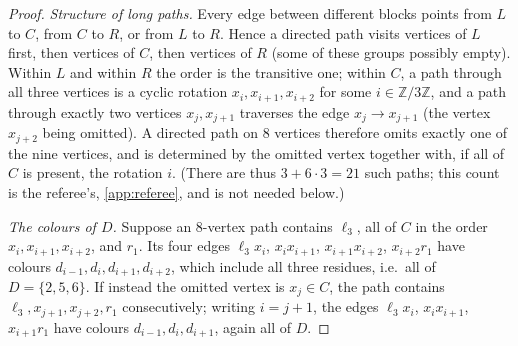 \documentclass[11pt,a4paper]{article}
\theoremstyle{plain}
\theoremstyle{definition}
\theoremstyle{remark}
\newcommand{\Z}{\mathbb Z}
\newcommand{\lv}{\ell}
\begin{document}
\label{pf:construction}
\lemconstr*
\begin{proof}
\emph{Structure of long paths.} Every edge between different blocks points from $L$ to $C$, from $C$ to $R$, or from $L$ to $R$. Hence a directed path visits vertices of $L$ first, then vertices of $C$, then vertices of $R$ (some of these groups possibly empty). Within $L$ and within $R$ the order is the transitive one; within $C$, a path through all three vertices is a cyclic rotation $x_i,x_{i+1},x_{i+2}$ for some $i\in\Z/3\Z$, and a path through exactly two vertices $x_j,x_{j+1}$ traverses the edge $x_j\to x_{j+1}$ (the vertex $x_{j+2}$ being omitted). A directed path on $8$ vertices therefore omits exactly one of the nine vertices, and is determined by the omitted vertex together with, if all of $C$ is present, the rotation $i$. (There are thus $3+6\cdot3=21$ such paths; this count is the referee's, \cref{app:referee}, and is not needed below.)

\emph{The colours of $D$.} Suppose an $8$-vertex path contains $\lv_3$, all of $C$ in the order $x_i,x_{i+1},x_{i+2}$, and $r_1$. Its four edges $\lv_3x_i$, $x_ix_{i+1}$, $x_{i+1}x_{i+2}$, $x_{i+2}r_1$ have colours $d_{i-1},d_i,d_{i+1},d_{i+2}$, which include all three residues, i.e.\ all of $D=\{2,5,6\}$. If instead the omitted vertex is $x_j\in C$, the path contains $\lv_3,x_{j+1},x_{j+2},r_1$ consecutively; writing $i=j+1$, the edges $\lv_3x_i$, $x_ix_{i+1}$, $x_{i+1}r_1$ have colours $d_{i-1},d_i,d_{i+1}$, again all of $D$.


\end{proof}
\end{document}
